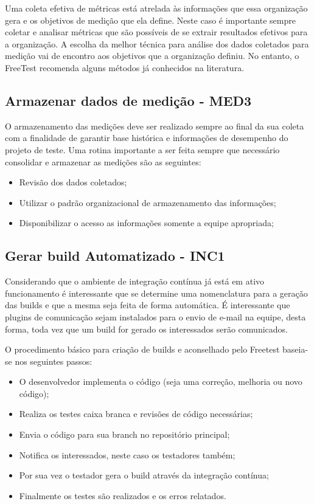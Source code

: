 Uma coleta efetiva de métricas está atrelada às informações que essa organização gera e os objetivos de medição que ela define. Neste caso é importante sempre coletar e analisar métricas que são possíveis de se extrair resultados efetivos para a organização. A escolha da melhor técnica para análise dos dados coletados para medição vai de encontro aos objetivos que a organização definiu. No entanto, o FreeTest recomenda alguns métodos já conhecidos na literatura.

\subsection{Armazenar dados de medição - MED3}

O armazenamento das medições deve ser realizado sempre ao final da sua coleta com a finalidade de garantir base histórica e informações de desempenho do projeto de teste. Uma rotina importante a ser feita sempre que necessário consolidar e armazenar as medições são as seguintes:

\begin{itemize}
\item Revisão dos dados coletados;
\item Utilizar o padrão organizacional de armazenamento das informações;
\item Disponibilizar o acesso as informações somente a equipe apropriada;
\end{itemize}

\subsection{Gerar build Automatizado - INC1}

Considerando que o ambiente de integração contínua já está em ativo funcionamento é interessante que se determine uma nomenclatura para a geração das builds e que a mesma seja feita de forma automática. É interessante que plugins de comunicação sejam instalados para o envio de e-mail na equipe, desta forma, toda vez que um build for gerado os interessados serão comunicados.

O procedimento básico para criação de builds e aconselhado pelo Freetest baseia-se nos seguintes passos:

\begin{itemize}
    \item O desenvolvedor implementa o código (seja uma correção, melhoria ou novo código);
    \item Realiza os testes caixa branca e revisões de código necessárias;
    \item Envia o código para sua branch no repositório principal;
    \item Notifica os interessados, neste caso os testadores também;
    \item Por sua vez o testador gera o build através da integração contínua;
    \item Finalmente os testes são realizados e os erros relatados.
\end{itemize}

